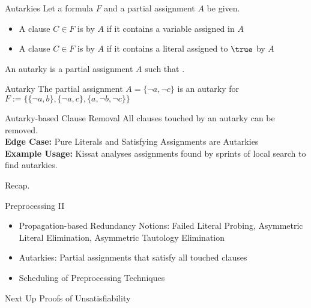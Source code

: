 \documentclass[t]{sdqbeamer}
\begin{document}
\begin{frame}{Autarkies}
Let a formula $F$ and a partial assignment $A$ be given.\\[1ex]
\begin{itemize}\setlength{\itemsep}{1ex}
    \item A clause $C \in F$ is  by $A$ if it contains a variable assigned in $A$
    \item A clause $C \in F$ is  by $A$ if it contains a literal assigned to $\true$ by $A$
\end{itemize}
An autarky is a partial assignment $A$ such that .
\begin{exampleblock}{Autarky}
The partial assignment $A = \{ \lnot a, \lnot c \}$ is an autarky for $F := \bigl\{\{ \lnot a, b \}, \{ \lnot a, c \}, \{ a, \lnot b, \lnot c \}\bigr\}$
\end{exampleblock}
\begin{block}{Autarky-based Clause Removal}
All clauses touched by an autarky can be removed.\\[1ex]
\textbf{Edge Case:} Pure Literals and Satisfying Assignments are Autarkies\\[1ex]
\textbf{Example Usage:} Kissat analyses assignments found by sprints of local search to find autarkies.
\end{block}
\end{frame}


\begin{frame}{Recap.}
\begin{block}{Preprocessing II}
    \begin{itemize}\setlength{\itemsep}{1em}
        \item Propagation-based Redundancy Notions: Failed Literal Probing, Asymmetric Literal Elimination, Asymmetric Tautology Elimination
        \item Autarkies: Partial assignments that satisfy all touched clauses
        \item Scheduling of Preprocessing Techniques
    \end{itemize}
\end{block}
\begin{block}{Next Up}
    Proofs of Unsatisfiability
\end{block}
\end{frame}
\end{document}
